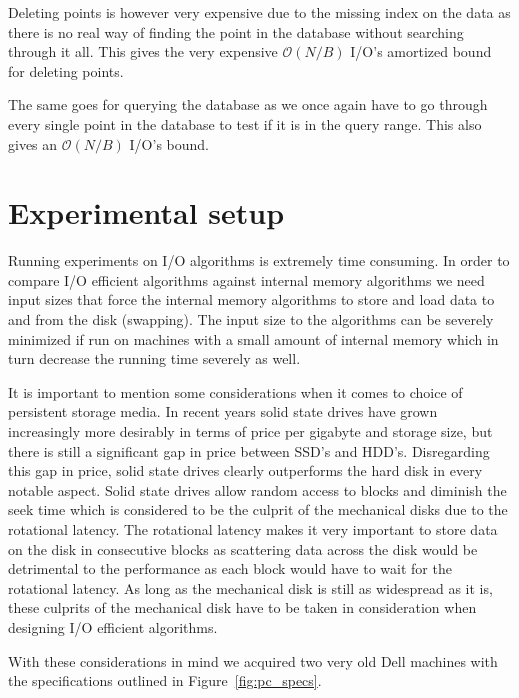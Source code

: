 \documentclass[twoside,11pt,openright]{report}
\begin{document}
Deleting points is however very expensive due to the missing index on the data as there is no real way of finding the point in the database without searching through it all. This gives the very expensive $\mathcal{O}(N/B)$ I/O's amortized bound for deleting points.

The same goes for querying the database as we once again have to go through every single point in the database to test if it is in the query range. This also gives an $\mathcal{O}(N/B)$ I/O's bound.

\chapter{Experimental setup}
\label{chp:experimental_setup}
Running experiments on I/O algorithms is extremely time consuming. In order to compare I/O efficient algorithms against internal memory algorithms we need input sizes that force the internal memory algorithms to store and load data to and from the disk (swapping). The input size to the algorithms can be severely minimized if run on machines with a small amount of internal memory which in turn decrease the running time severely as well.

It is important to mention some considerations when it comes to choice of persistent storage media. In recent years solid state drives have grown increasingly more desirably in terms of price per gigabyte and storage size, but there is still a significant gap in price between SSD's and HDD's. Disregarding this gap in price, solid state drives clearly outperforms the hard disk in every notable aspect. Solid state drives allow random access to blocks and diminish the seek time which is considered to be the culprit of the mechanical disks due to the rotational latency.
The rotational latency makes it very important to store data on the disk in consecutive blocks as scattering data across the disk would be detrimental to the performance as each block would have to wait for the rotational latency. As long as the mechanical disk is still as widespread as it is, these culprits of the mechanical disk have to be taken in consideration when designing I/O efficient algorithms.

With these considerations in mind we acquired two very old Dell machines with the specifications outlined in Figure~\ref{fig:pc_specs}.
\end{document}
